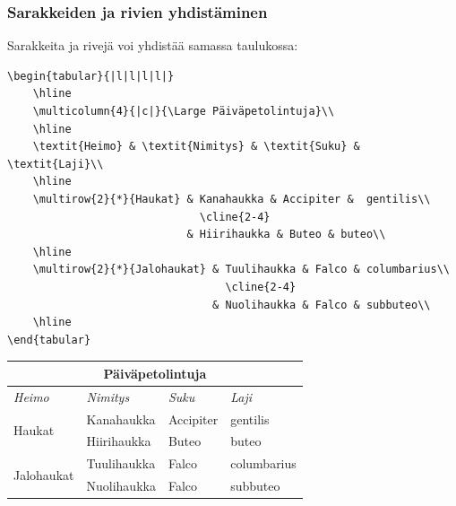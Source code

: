 \documentclass[handout,hyperref={colorlinks=true}]{beamer}
\theoremstyle{remark}
\newcommand{\vaihto}{\\ \vspace{10pt}}
\begin{document}
\begin{frame}[fragile]
    \frametitle{Sarakkeiden ja rivien yhdistäminen} 
    Sarakkeita ja rivejä voi yhdistää samassa taulukossa:\vaihto
    \begin{minipage}{8cm}
        \begin{scriptsize}
            \begin{verbatim}
\begin{tabular}{|l|l|l|l|}
    \hline
    \multicolumn{4}{|c|}{\Large Päiväpetolintuja}\\
    \hline
    \textit{Heimo} & \textit{Nimitys} & \textit{Suku} & \textit{Laji}\\
    \hline
    \multirow{2}{*}{Haukat} & Kanahaukka & Accipiter &  gentilis\\
                              \cline{2-4}
                            & Hiirihaukka & Buteo & buteo\\
    \hline
    \multirow{2}{*}{Jalohaukat} & Tuulihaukka & Falco & columbarius\\
                                  \cline{2-4}
                                & Nuolihaukka & Falco & subbuteo\\
    \hline
\end{tabular}
            \end{verbatim}
        \end{scriptsize}
    \end{minipage}
    \begin{table}[h!]
        \begin{scriptsize}
            \begin{tabular}{|l|l|l|l|}
                \hline
                \multicolumn{4}{|c|}{\Large Päiväpetolintuja}\\
                \hline
                \textit{Heimo} & \textit{Nimitys} & \textit{Suku} & \textit{Laji}\\\hline
                \multirow{2}{*}{Haukat} & Kanahaukka & Accipiter &  gentilis\\ \cline{2-4}
                                        & Hiirihaukka & Buteo & buteo\\ \hline
                \multirow{2}{*}{Jalohaukat} & Tuulihaukka & Falco & columbarius\\ \cline{2-4}
                                            &Nuolihaukka & Falco & subbuteo\\ \hline
            \end{tabular}
        \end{scriptsize}
    \end{table}

\end{frame}
\end{document}
